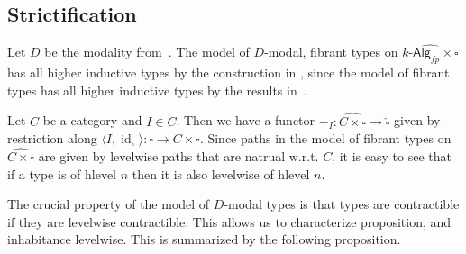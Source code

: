 \documentclass[10pt,a4paper]{article}
\newcommand{\Alg}{\mathsf{Alg}}
\DeclareMathOperator\id{id}
\begin{document}
\subsection{Strictification}

Let $D$ be the modality from~\cite{CRS21}.
The model of $D$-modal, fibrant types on $\widehat{k\text{-}\Alg_{fp} \times \square}$ has all higher inductive types by the construction in \cite{CRS21}, since the model of fibrant types has all higher inductive types by the results in~\cite{CoquandHM18}.

Let $C$ be a category and $I \in C$.
Then we have a functor $-_I : \widehat{C \times \square} \to \widehat{\square}$ given by restriction along $\langle I, \id_{\square} \rangle \colon \square \to C \times \square$.
Since paths in the model of fibrant types on $\widehat{C \times \square}$ are given by levelwise paths that are natrual w.r.t. $C$, it is easy to see that if a type is of hlevel $n$ then it is also levelwise of hlevel $n$. 

The crucial property of the model of $D$-modal types is that types are contractible if they are levelwise contractible.
This allows us to characterize proposition, and inhabitance levelwise.
This is summarized by the following proposition.
\end{document}
